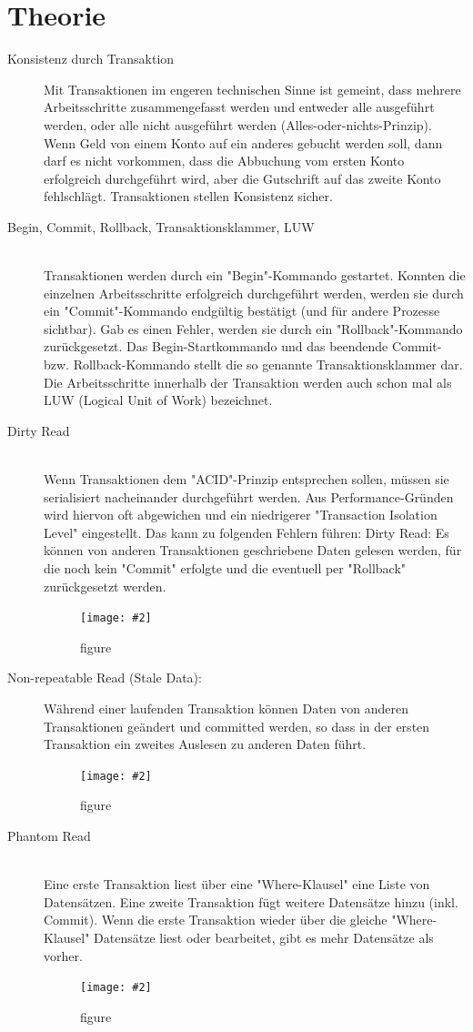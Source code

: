 \documentclass[a4paper,10pt]{scrreprt}
\newcommand{\pic}[2][figure]{\begin{figure}[h]
 \centering
 \texttt{[image: \#2]}
 \caption{#1}
\end{figure}
}
\begin{document}
\section{Theorie}
\begin{description}
\item[ Konsistenz durch Transaktion] Mit Transaktionen im engeren technischen Sinne ist gemeint, dass mehrere 
Arbeitsschritte zusammengefasst werden und entweder alle ausgeführt werden, oder alle nicht ausgeführt werden
(Alles-oder-nichts-Prinzip). Wenn Geld von einem Konto auf ein anderes gebucht werden soll, dann
darf es nicht vorkommen, dass die Abbuchung vom ersten Konto erfolgreich durchgeführt wird, aber
die Gutschrift auf das zweite Konto fehlschlägt. Transaktionen stellen Konsistenz sicher.
\item[Begin, Commit, Rollback, Transaktionsklammer, LUW] \hfill \\
Transaktionen werden durch ein "Begin"-Kommando gestartet. Konnten die einzelnen Arbeitsschritte
erfolgreich durchgeführt werden, werden sie durch ein "Commit"-Kommando endgültig bestätigt (und
für andere Prozesse sichtbar). Gab es einen Fehler, werden sie durch ein "Rollback"-Kommando
zurückgesetzt. Das Begin-Startkommando und das beendende Commit- bzw. Rollback-Kommando
stellt die so genannte Transaktionsklammer dar. Die Arbeitsschritte innerhalb der Transaktion
werden auch schon mal als LUW (Logical Unit of Work) bezeichnet.

\item[Dirty Read] \hfill \\
Wenn Transaktionen dem "ACID"-Prinzip entsprechen sollen, müssen sie serialisiert nacheinander
durchgeführt werden. Aus Performance-Gründen wird hiervon oft abgewichen und ein niedrigerer
"Transaction Isolation Level" eingestellt. Das kann zu folgenden Fehlern führen:
Dirty Read:
Es können von anderen Transaktionen geschriebene Daten gelesen werden, für
die noch kein "Commit" erfolgte und die eventuell per "Rollback" zurückgesetzt
werden.\\
\pic{dread.png}
\item[Non-repeatable Read (Stale Data):] Während einer laufenden Transaktion können Daten von
anderen Transaktionen geändert und committed werden, so dass in der ersten
Transaktion ein zweites Auslesen zu anderen Daten führt.\\
\pic{nrr.png}
\item[Phantom Read] \hfill \\
Eine erste Transaktion liest über eine "Where-Klausel" eine Liste von
Datensätzen. Eine zweite Transaktion fügt weitere Datensätze hinzu (inkl.
Commit). Wenn die erste Transaktion wieder über die gleiche "Where-Klausel"
Datensätze liest oder bearbeitet, gibt es mehr Datensätze als vorher.\\
\pic{pread.png}
\end{description}
\end{document}
